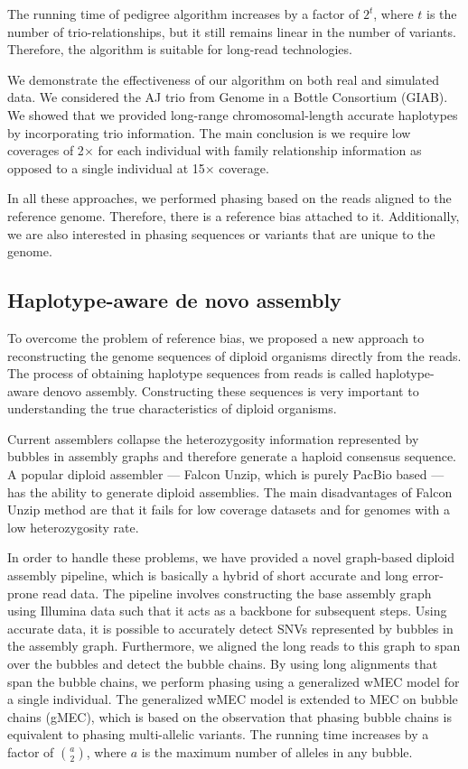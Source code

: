 The running time of pedigree algorithm increases by a factor of $2^t$, where $t$ is the number of trio-relationships, but it still remains linear in the number of variants.
Therefore, the algorithm is suitable for long-read technologies.

We demonstrate the effectiveness of our algorithm on both real and simulated data. We considered the AJ trio from Genome in a Bottle Consortium (GIAB).
We showed that we provided long-range chromosomal-length accurate haplotypes by incorporating trio information.
The main conclusion is we require low coverages of 2$\times$ for each individual with family relationship information as opposed to a single individual at 15$\times$ coverage.

In all these approaches, we performed phasing based on the reads aligned to the reference genome. Therefore, there is a reference bias attached to it.
Additionally, we are also interested in phasing sequences or variants that are unique to the genome.

\subsection{Haplotype-aware de novo assembly}
To overcome the problem of reference bias, we proposed a new approach to reconstructing the genome sequences of diploid organisms directly from the reads.
The process of obtaining haplotype sequences from reads is called haplotype-aware denovo assembly.
Constructing these sequences is very important to understanding the true characteristics of diploid organisms.

Current assemblers collapse the heterozygosity information represented by bubbles in assembly graphs and therefore generate a haploid consensus sequence.
A popular diploid assembler --- Falcon Unzip, which is purely PacBio based --- has the ability to generate diploid assemblies.
The main disadvantages of Falcon Unzip method are that it fails for low coverage datasets and for genomes with a low heterozygosity rate.

In order to handle these problems, we have provided a novel graph-based diploid assembly pipeline, which is basically a hybrid of short accurate and long error-prone read data.
The pipeline involves constructing the base assembly graph using Illumina data such that it acts as a backbone for subsequent steps.
Using accurate data, it is possible to accurately detect SNVs represented by bubbles in the assembly graph.
Furthermore, we aligned the long reads to this graph to span over the bubbles and detect the bubble chains.
By using long alignments that span the bubble chains, we perform phasing using a generalized wMEC model for a single individual.
The generalized wMEC model is extended to MEC on bubble chains (gMEC), which is based on the observation that phasing bubble chains is equivalent to phasing multi-allelic variants.
The running time increases by a factor of $a \choose 2$, where $a$ is the maximum number of alleles in any bubble.

